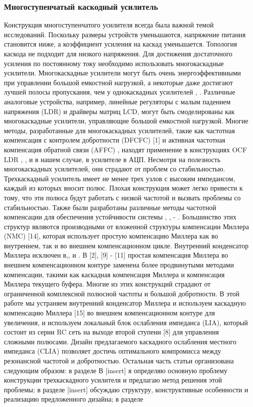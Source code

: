 \documentclass[a4paper,12pt]{article} %
\begin{document}
\subsubsection{Многоступенчатый каскодный усилитель}

Конструкция многоступенчатого усилителя всегда была важной темой исследований. Поскольку размеры устройств уменьшаются, напряжение питания становится ниже, а коэффициент усиления на каскад уменьшается. Топология каскода не подходит для низкого напряжения. Для достижения достаточного усиления по постоянному току необходимо использовать многокаскадные усилители. Многокаскадные усилители могут быть очень энергоэффективными при управлении большой емкостной нагрузкой, а некоторые даже достигают лучшей полосы пропускания, чем у однокаскадных усилителей \cite{op_amp_comp1}, \cite{op_amp_comp2}. Различные аналоговые устройства, например, линейные регуляторы с малым падением напряжения (LDR) и  драйверы матриц LCD, могут быть смоделированы как многокаскадные усилители, управляющие большой емкостной нагрузкой. Многие методы, разработанные для многокаскадных усилителей, такие как частотная компенсация с контролем добротности (DFCFC) [1] и активная частотная компенсация обратной связи (AFFC) \cite{op_amp_comp1}, находят применение в конструкциях OCF LDR \cite{op_amp_comp3}, \cite{op_amp_comp4}, и в нашем случае, в усилителе в АЦП. Несмотря на полезность многокаскадных усилителей, они страдают от проблем со стабильностью. Трехкаскадный усилитель имеет не менее трех узлов с высоким импедансом, каждый из которых вносит полюс. Плохая конструкция может легко привести к тому, что эти полюса будут работать с низкой частотой и вызвать проблемы со стабильностью. Также были разработаны различные методы частотной компенсации для обеспечения устойчивости системы \cite{op_amp_comp2}, \cite{op_amp_comp3}, \cite{op_amp_comp4} - \cite{op_amp_comp1}. Большинство этих структур являются производными от вложенной структуры компенсации Миллера (NMC) [14], которая использует простую компенсацию Миллера как во внутреннем, так и во внешнем компенсационном цикле. Внутренний конденсатор Миллера исключен в\cite{op_amp_comp1},\cite{op_amp_comp3},\cite{op_amp_comp4} и \cite{op_amp_comp2} . В [2], [9] - [11] простая компенсация Миллера во внешнем компенсационном контуре заменена более продвинутыми методами компенсации, такими как каскадная компенсация Миллера и компенсация Миллера текущего буфера. Многие из этих конструкций страдают от ограниченной комплексной полюсной частоты и большой добротности. В этой работе мы устраняем внутренний конденсатор Миллера и используем каскадную компенсацию Миллера [15] во внешнем компенсационном контуре для увеличения, и используем локальный блок ослабления импеданса (LIA), который состоит из серии RC сеть на выходе второй ступени [8] для управления сложными полюсами. Дизайн предлагаемого каскадного ослабления местного импеданса (CLIA)  позволяет достичь оптимального компромисса между резонансной частотой и добротностью. Остальная часть статьи организована следующим образом: в разделе В [insert] я определяю основную проблему конструкции трехкаскадного усилителя и предлагаю метод решения этой проблемы; в разделе [insert] обсуждаю структуру, конструктивные особенности и реализацию предложенного дизайна; в разделе 
\end{document}
